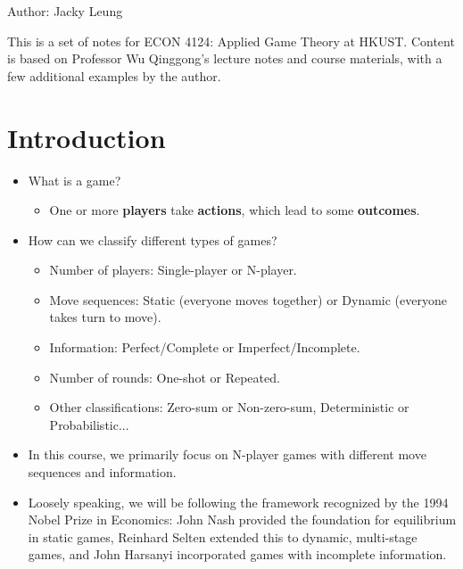 \documentclass[notitlepage]{article}
\begin{document}
Author: Jacky Leung

This is a set of notes for ECON 4124: Applied Game Theory at HKUST. Content is based on Professor Wu Qinggong's lecture notes and course materials, with a few additional examples by the author.


\section{Introduction}

\begin{itemize}
    \item What is a game?
    \begin{itemize}
        \item One or more \textbf{players} take \textbf{actions}, which lead to some \textbf{outcomes}.
    \end{itemize}
    \item How can we classify different types of games?
    \begin{itemize}
        \item Number of players: Single-player or N-player.
        \item Move sequences: Static (everyone moves together) or Dynamic (everyone takes turn to move).
        \item Information: Perfect/Complete or Imperfect/Incomplete.
        \item Number of rounds: One-shot or Repeated.
        \item Other classifications: Zero-sum or Non-zero-sum, Deterministic or Probabilistic...
    \end{itemize}
    \item In this course, we primarily focus on N-player games with different move sequences and information.
    \item Loosely speaking, we will be following the framework recognized by the 1994 Nobel Prize in Economics: John Nash provided the foundation for equilibrium in static games, Reinhard Selten extended this to dynamic, multi-stage games, and John Harsanyi incorporated games with incomplete information.
\end{itemize}
\end{document}

